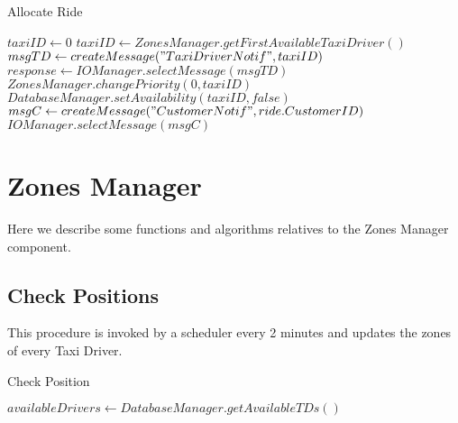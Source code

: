 \documentclass[../../dd.tex]{subfiles}
\begin{document}
				\begin{algorithm}
					\caption{Allocate Ride}\label{alg:allocateRide}
					\begin{algorithmic}[3]
						\State $taxiID\gets 0$
						\Repeat
							\State $taxiID\gets ZonesManager.getFirstAvailableTaxiDriver()$
							\State $msgTD\gets createMessage("TaxiDriverNotif", taxiID)$
							\State $response\gets IOManager.selectMessage(msgTD)$
							\State $ZonesManager.changePriority(0, taxiID)$
						\State $DatabaseManager.setAvailability(taxiID, false)$
						\State $msgC\gets createMessage("CustomerNotif", ride.CustomerID)$
						\State $IOManager.selectMessage(msgC)$
					\EndProcedure
					\end{algorithmic}
				\end{algorithm}

		\section{Zones Manager}
			Here we describe some functions and algorithms relatives to the Zones Manager component.

			\subsection{Check Positions}
				This procedure is invoked by a scheduler every 2 minutes and updates the zones  of every Taxi Driver.

				\begin{algorithm}
					\caption{Check Position}\label{alg:checkPosition}
					\begin{algorithmic}[4]
					\Procedure{checkPositions}{}
						\State $availableDrivers\gets DatabaseManager.getAvailableTDs()$
					\EndProcedure
					\end{algorithmic}
				\end{algorithm}
\end{document}
